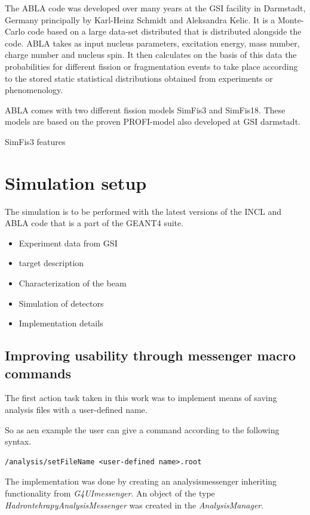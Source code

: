 The ABLA code was developed over many years at the GSI facility in Darmstadt, Germany principally by Karl-Heinz Schmidt and Aleksandra Kelic. It is a Monte-Carlo code based on a large data-set distributed that is distributed alongside the code. ABLA takes as input nucleus parameters, excitation energy, mass number, charge number and nucleus spin. It then calculates on the basis of this data the probabilities for different fission or fragmentation events to take place according to the stored static statistical distributions obtained from experiments or phenomenology.

ABLA comes with two different fission models SimFis3 and SimFis18. These models are based on the proven PROFI-model also developed at GSI darmstadt.

SimFis3 features


\section{Simulation setup} %
The simulation is to be performed with the latest versions of the INCL and ABLA code that is a part of the GEANT4 suite.

\begin{itemize}
\item Experiment data from GSI
\item target description
\item Characterization of the beam
\item Simulation of detectors
\item Implementation details
\end{itemize}

\subsection{Improving usability through messenger macro commands}
The first action task taken in this work was to implement means of saving analysis files with a user-defined name.

So as aen example the user can give a command according to the following syntax.
\scriptsize
\begin{verbatim}
/analysis/setFileName <user-defined name>.root
\end{verbatim}
\normalsize

The implementation was done by creating an analysismessenger inheriting functionality from \textit{G4UImessenger}. An object of the type \textit{HadrontehrapyAnalysisMessenger} was created in the \textit{AnalysisManager}.



